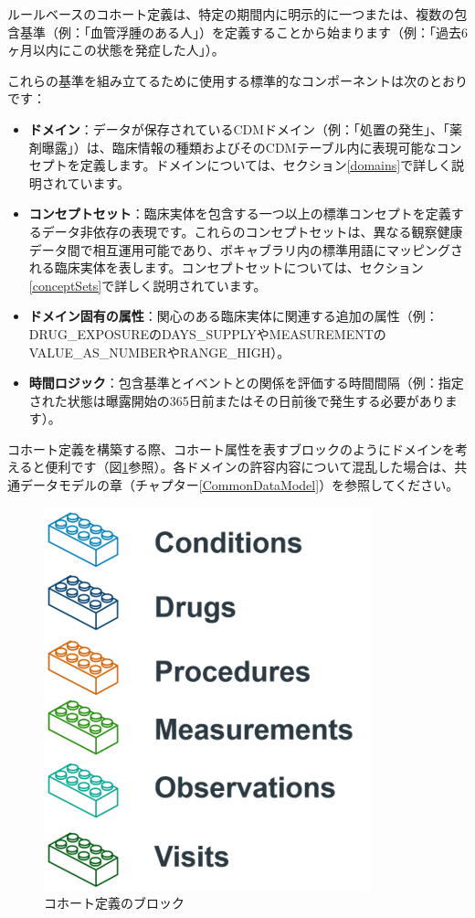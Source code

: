 \documentclass[
  11pt]{book}
\theoremstyle{definition}
\theoremstyle{definition}
\theoremstyle{definition}
\theoremstyle{definition}
\theoremstyle{remark}
\begin{document}
ルールベースのコホート定義は、特定の期間内に明示的に一つまたは、複数の包含基準（例：「血管浮腫のある人」）を定義することから始まります（例：「過去6ヶ月以内にこの状態を発症した人」）。

これらの基準を組み立てるために使用する標準的なコンポーネントは次のとおりです：

\begin{itemize}
\item
  \textbf{ドメイン}：データが保存されているCDMドメイン（例：「処置の発生」、「薬剤曝露」）は、臨床情報の種類およびそのCDMテーブル内に表現可能なコンセプトを定義します。ドメインについては、セクション\ref{domains}で詳しく説明されています。
\item
  \textbf{コンセプトセット}：臨床実体を包含する一つ以上の標準コンセプトを定義するデータ非依存の表現です。これらのコンセプトセットは、異なる観察健康データ間で相互運用可能であり、ボキャブラリ内の標準用語にマッピングされる臨床実体を表します。コンセプトセットについては、セクション\ref{conceptSets}で詳しく説明されています。
\item
  \textbf{ドメイン固有の属性}：関心のある臨床実体に関連する追加の属性（例：DRUG\_EXPOSUREのDAYS\_SUPPLYやMEASUREMENTのVALUE\_AS\_NUMBERやRANGE\_HIGH）。
\item
  \textbf{時間ロジック}：包含基準とイベントとの関係を評価する時間間隔（例：指定された状態は曝露開始の365日前またはその日前後で発生する必要があります）。
\end{itemize}

コホート定義を構築する際、コホート属性を表すブロックのようにドメインを考えると便利です（図\ref{fig:cohortLegos}参照）。各ドメインの許容内容について混乱した場合は、共通データモデルの章（チャプター\ref{CommonDataModel}）を参照してください。

\begin{figure}

{\centering \includegraphics[width=0.5\linewidth]{images/Cohorts/cohort-legos} 

}

\caption{コホート定義のブロック}\label{fig:cohortLegos}
\end{figure}
\end{document}
